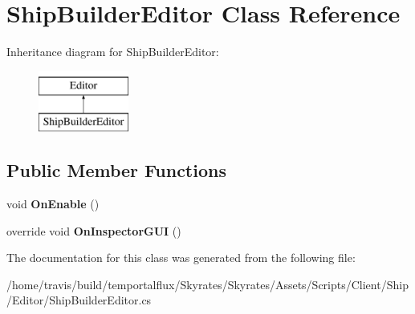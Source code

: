 \hypertarget{class_ship_builder_editor}{\section{Ship\-Builder\-Editor Class Reference}
\label{class_ship_builder_editor}
}
Inheritance diagram for Ship\-Builder\-Editor\-:\begin{figure}[H]
\begin{center}
\leavevmode
\includegraphics[height=2.000000cm]{class_ship_builder_editor}
\end{center}
\end{figure}
\subsection*{Public Member Functions}
\begin{DoxyCompactItemize}
\item 
\hypertarget{class_ship_builder_editor_a3f3c96455e04c535fc1bd87469be1bf5}{void {\bfseries On\-Enable} ()}\label{class_ship_builder_editor_a3f3c96455e04c535fc1bd87469be1bf5}

\item 
\hypertarget{class_ship_builder_editor_ae90791f5bc2ced790b538c1c2d23f7c0}{override void {\bfseries On\-Inspector\-G\-U\-I} ()}\label{class_ship_builder_editor_ae90791f5bc2ced790b538c1c2d23f7c0}

\end{DoxyCompactItemize}


The documentation for this class was generated from the following file\-:\begin{DoxyCompactItemize}
\item 
/home/travis/build/temportalflux/\-Skyrates/\-Skyrates/\-Assets/\-Scripts/\-Client/\-Ship/\-Editor/Ship\-Builder\-Editor.\-cs\end{DoxyCompactItemize}
